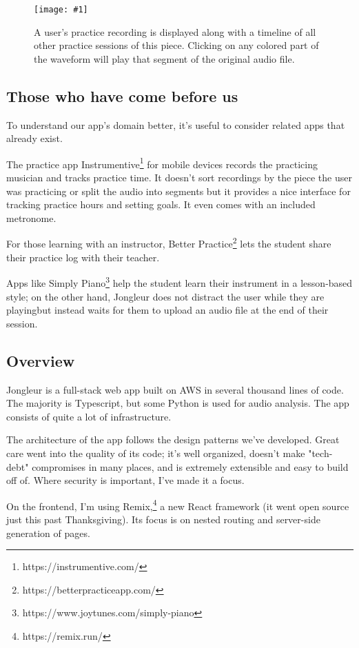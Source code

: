 \documentclass{article}
\newcommand{\screenshot}[2]{
  \begin{figure}[h]
    \texttt{[image: \#1]}
    \caption*{#2}
  \end{figure}
}
\begin{document}
\screenshot{jong-practice}{A user's practice recording is displayed along with a timeline of all other practice sessions of this piece. Clicking on any colored part of the waveform will play that segment of the original audio file.}

\subsection{Those who have come before us}

To understand our app's domain better, it's useful to consider related apps that already exist.

The practice app Instrumentive\footnote{https://instrumentive.com/} for mobile devices records the practicing musician and tracks practice time.
It doesn't sort recordings by the piece the user was practicing or split the audio into segments but it provides a nice interface for tracking practice hours and setting goals.
It even comes with an included metronome.

For those learning with an instructor, Better Practice\footnote{https://betterpracticeapp.com/} lets the student share their practice log with their teacher.

Apps like Simply Piano\footnote{https://www.joytunes.com/simply-piano} help the student learn their instrument in a lesson-based style; on the other hand, Jongleur does not distract the user while they are playingbut instead waits for them to upload an audio file at the end of their session.

\subsection{Overview}
Jongleur is a full-stack web app built on AWS in several thousand lines of code.
The majority is Typescript, but some Python is used for audio analysis.
The app consists of quite a lot of infrastructure.

The architecture of the app follows the design patterns we've developed.
Great care went into the quality of its code; it's well organized, doesn't make "tech-debt" compromises in many places, and is extremely extensible and easy to build off of.
Where security is important, I've made it a focus.

On the frontend, I'm using Remix,\footnote{https://remix.run/} a new React framework (it went open source just this past Thanksgiving).
Its focus is on nested routing and server-side generation of pages.
\end{document}
